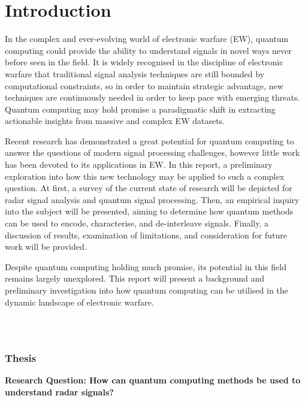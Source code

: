 \section{Introduction}
\label{sec:introduction}

In the complex and ever-evolving world of electronic warfare (EW), quantum computing could provide the ability to understand signals in novel ways never before seen in the field. It is widely recognised in the discipline of electronic warfare that traditional signal analysis techniques are still bounded by computational constraints, so in order to maintain strategic advantage, new techniques are continuously needed in order to keep pace with emerging threats. Quantum computing may hold promise a paradigmatic shift in extracting actionable insights from massive and complex EW datasets. 

Recent research has demonstrated a great potential for quantum computing 
 to answer the questions of modern signal processing challenges\cite{}, however little work has been devoted to its applications in EW. In this report, a preliminary exploration into how this new technology may be applied to such a complex question. At first, a survey of the current state of research will be depicted for radar signal analysis and quantum signal processing. Then, an empirical inquiry into the subject will be presented, aiming to determine how quantum methods can be used to encode, characterise, and de-interleave signals. Finally, a discussion of results, examination of limitations, and consideration for future work will be provided. 
 
Despite quantum computing holding much promise, its potential in this field remains largely unexplored. This report will present a background and preliminary investigation into how quantum computing can be utilised in the dynamic landscape of electronic warfare. 

\subsection{}~\label{subsec:aims}
\subsubsection{Thesis}
\textbf{Research Question: How can quantum computing methods be used to understand radar signals?}

